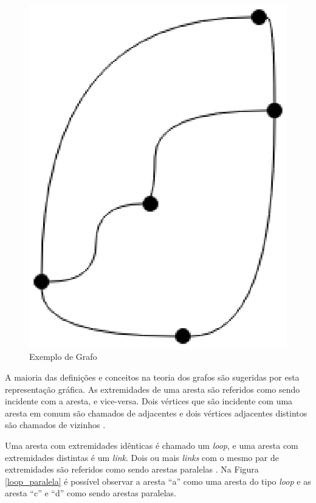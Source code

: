 \begin{figure}[!h]
	\centering
	\includegraphics[scale=0.5]{figuras/capitulo2/exemplo_grafo.eps}
	\caption{Exemplo de Grafo}
	\label{exemplo_grafo}
\end{figure}

A maioria das definições e conceitos na teoria dos grafos são sugeridas por esta representação gráfica. As extremidades de uma aresta são referidos como sendo incidente com a aresta, e vice-versa. Dois vértices que são incidente com uma aresta em comum são chamados de adjacentes e dois vértices adjacentes distintos são chamados de vizinhos \cite{Costa:2011}.

Uma aresta com extremidades idênticas é chamado um \textit{loop}, e uma aresta com extremidades distintas é um \textit{link}. Dois ou mais \textit{links} com o mesmo par de extremidades são referidos como sendo arestas paralelas \cite{Bondy:2007}. Na Figura \ref{loop_paralela} é possível observar a aresta ``a'' como uma aresta do tipo \textit{loop} e as aresta ``c'' e ``d'' como sendo arestas paralelas.

